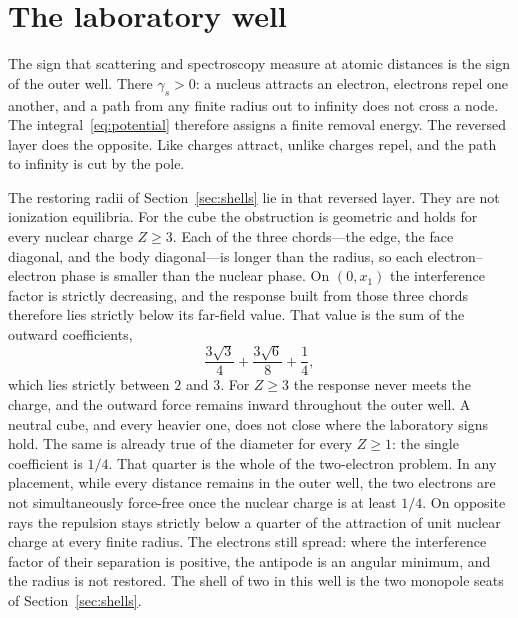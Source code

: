 \documentclass[a4paper]{article}
\begin{document}
\section{The laboratory well}
\label{sec:lab}

The sign that scattering and spectroscopy measure at atomic distances is the sign of the outer well. There \(\gamma_s>0\): a nucleus attracts an electron, electrons repel one another, and a path from any finite radius out to infinity does not cross a node. The integral~\eqref{eq:potential} therefore assigns a finite removal energy. The reversed layer does the opposite. Like charges attract, unlike charges repel, and the path to infinity is cut by the pole.

The restoring radii of Section~\ref{sec:shells} lie in that reversed layer. They are not ionization equilibria. For the cube the obstruction is geometric and holds for every nuclear charge \(Z\ge 3\). Each of the three chords---the edge, the face diagonal, and the body diagonal---is longer than the radius, so each electron--electron phase is smaller than the nuclear phase. On \((0,x_1)\) the interference factor is strictly decreasing, and the response built from those three chords therefore lies strictly below its far-field value. That value is the sum of the outward coefficients,
\[
\frac{3\sqrt{3}}{4}+\frac{3\sqrt{6}}{8}+\frac14,
\]
which lies strictly between \(2\) and \(3\). For \(Z\ge 3\) the response never meets the charge, and the outward force remains inward throughout the outer well. A neutral cube, and every heavier one, does not close where the laboratory signs hold. The same is already true of the diameter for every \(Z\ge 1\): the single coefficient is \(1/4\). That quarter is the whole of the two-electron problem. In any placement, while every distance remains in the outer well, the two electrons are not simultaneously force-free once the nuclear charge is at least \(1/4\). On opposite rays the repulsion stays strictly below a quarter of the attraction of unit nuclear charge at every finite radius. The electrons still spread: where the interference factor of their separation is positive, the antipode is an angular minimum, and the radius is not restored. The shell of two in this well is the two monopole seats of Section~\ref{sec:shells}.
\end{document}
